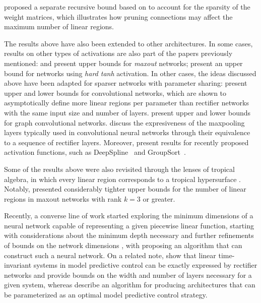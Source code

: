 \cite{cai2023pruning} proposed a separate recursive bound based on \cite{serra2018bounding} to account for the sparsity of the weight matrices, 
which illustrates how pruning connections may affect the maximum number of linear regions.

The results above have also been extended to other architectures. 
In some cases, results on other types of activations are also part of the papers previously mentioned: 
\cite{montufar2014on} and \cite{serra2018bounding} present upper bounds for \emph{maxout} networks; 
\cite{raghu2017expressive} present an upper bound for networks using \emph{hard tanh} activation. 
In other cases, the ideas discussed above have been adapted for sparser networks with parameter sharing: 
\cite{xiong2020cnn} present upper and lower bounds for convolutional networks, 
which are shown to asymptotically define more linear regions per parameter than rectifier networks with the same input size and number of layers. 
\cite{chen2022gcn} present upper and lower bounds for graph convolutional networks. 
\cite{matoba2022maxpooling} discuss the expresiveness of the maxpooling layers typically used in convolutional neural networks through their equivalence to a sequence of rectifier layers. 
Moreover, \cite{goujon2022role} present results for recently proposed activation functions, 
such as DeepSpline~\citep{agostineli2015spline,unser2019representer,bohra2020learning} and GroupSort~\citep{anil2019groupsort}. 

Some of the results above were also revisited through the lenses of tropical algebra, 
in which every linear region corresponds to a tropical hypersurface \citep{zhang2018tropical,charisopoulos2018tropical,maragos2021tropical}. 
Notably, \cite{montufar2022maxout} presented considerably tighter upper bounds for the number of linear regions in maxout networks with rank $k=3$ or greater. 

Recently, a converse line of work started exploring the minimum dimensions of a neural network capable of representing a given piecewise linear function, 
starting with considerations about the minimum depth necessary \citep{arora2018understanding} and further refinements of bounds on the network dimensions \citep{he2020finite,hertrich2021depth,chen2022bounds}, 
with \cite{chen2022bounds} proposing an algorithm that can construct such a neural network. 
On a related note, 
\cite{MPC} show that linear time-invariant systems in model predictive control can be exactly expressed by rectifier networks and provide bounds on the width and number of layers necessary for a given system, whereas \cite{ferlez2020aren} describe an algorithm for producing architectures that can be parameterized as an optimal model predictive control strategy.

